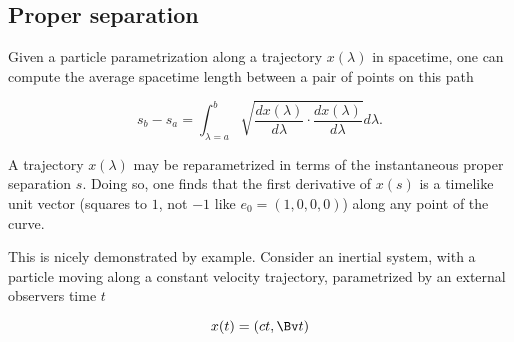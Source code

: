 \subsection{Proper separation}

Given a particle parametrization along a trajectory $x(\lambda)$ in spacetime, one can compute the average spacetime length between a pair of points on this path

\begin{equation}\label{eqn:grahamSchmidtLorentz:400}
s_b - s_a = \int_{\lambda = a}^b \sqrt{ \frac{d x(\lambda)}{d\lambda} \cdot \frac{d x(\lambda)}{d\lambda} } d\lambda.
\end{equation}

%
%
%

A trajectory $x(\lambda)$ may be reparametrized in terms of the instantaneous proper separation $s$.  Doing so, one finds that the first derivative of $x(s)$ is a timelike unit vector (squares to $1$, not $-1$ like $e_0 = (1, 0, 0, 0)$) along any point of the curve.

This is nicely demonstrated by example.
%
%
Consider an inertial system, with a particle moving along a constant velocity trajectory, parametrized by an external observers time $t$

\begin{equation}\label{eqn:grahamSchmidtLorentz:440}
x(t) = (c t, \Bv t)
\end{equation}


